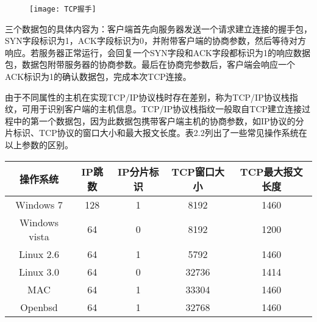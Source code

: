 \begin{figure}[!h]
    \centering
    \texttt{[image: TCP握手]}
\end{figure}

三个数据包的具体内容为：客户端首先向服务器发送一个请求建立连接的握手包，SYN字段标识为1，ACK字段标识为0，并附带客户端的协商参数，然后等待对方响应。若服务器正常运行，会回复一个SYN字段和ACK字段都标识为1的响应数据包，数据包附带服务器的协商参数。最后在协商完参数后，客户端会响应一个ACK标识为1的确认数据包，完成本次TCP连接。
 
由于不同属性的主机在实现TCP/IP协议栈时存在差别，称为TCP/IP协议栈指纹，可用于识别客户端的主机信息。TCP/IP协议栈指纹一般取自TCP建立连接过程中的第一个数据包，因为此数据包携带客户端主机的协商参数，如IP协议的分片标识、TCP协议的窗口大小和最大报文长度。表2.2列出了一些常见操作系统在以上参数的区别。

\begin{table}[!htbp] 
    \centering
    \footnotesize
    \setlength{\tabcolsep}{10pt}
    \renewcommand{\arraystretch}{1.2}
\begin{tabular}{ccccc}
\toprule
操作系统 & IP跳数 & IP分片标识 & TCP窗口大小 & TCP最大报文长度\\ \hline
Windows 7 & 128 & 1 & 8192 & 1460 \\
Windows vista  & 64 & 0 & 8192 & 1200 \\
Linux 2.6 & 64& 1& 5792& 1460 \\
Linux 3.0 & 64 & 0 & 32736 & 1414 \\
MAC & 64 & 1& 33304 & 1460 \\
Openbsd & 64 & 1& 32768 & 1460 \\
\bottomrule
\end{tabular}
\end{table}



